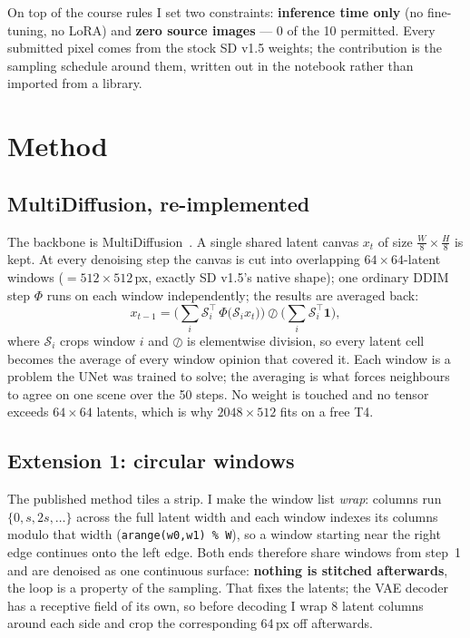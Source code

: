 \documentclass[10pt,a4paper,twocolumn]{article}
\newcommand{\tw}[1]{\texttt{\footnotesize #1}}
\begin{document}
On top of the course rules I set two constraints: \textbf{inference time only} (no
fine-tuning, no LoRA) and \textbf{zero source images} --- 0 of the 10 permitted.
Every submitted pixel comes from the stock SD v1.5 weights; the contribution is
the sampling schedule around them, written out in the notebook rather than
imported from a library.

\section{Method}

\subsection{MultiDiffusion, re-implemented}

The backbone is MultiDiffusion~\cite{multidiffusion}. A single shared latent
canvas $x_t$ of size $\tfrac{W}{8}\times\tfrac{H}{8}$ is kept. At every denoising
step the canvas is cut into overlapping $64\times64$-latent windows
($=512\times512$\,px, exactly SD v1.5's native shape); one ordinary DDIM step
$\Phi$ runs on each window independently; the results are averaged back:
\begin{equation}
x_{t-1}=\Big(\textstyle\sum_i \mathcal{S}_i^{\!\top}\,\Phi\big(\mathcal{S}_i x_t\big)\Big)
\oslash\Big(\textstyle\sum_i \mathcal{S}_i^{\!\top}\mathbf{1}\Big),
\end{equation}
where $\mathcal{S}_i$ crops window $i$ and $\oslash$ is elementwise division, so
every latent cell becomes the average of every window opinion that covered it.
Each window is a problem the UNet was trained to solve; the averaging is what
forces neighbours to agree on one scene over the 50 steps. No weight is touched
and no tensor exceeds $64\times64$ latents, which is why $2048\times512$ fits on a
free T4.

\subsection{Extension 1: circular windows}

The published method tiles a strip. I make the window list \emph{wrap}: columns
run $\{0,s,2s,\dots\}$ across the full latent width and each window indexes its
columns modulo that width (\tw{arange(w0,w1) \% W}), so a window starting near the
right edge continues onto the left edge. Both ends therefore share windows from
step~1 and are denoised as one continuous surface: \textbf{nothing is stitched
afterwards}, the loop is a property of the sampling. That fixes the latents; the
VAE decoder has a receptive field of its own, so before decoding I wrap 8 latent
columns around each side and crop the corresponding 64\,px off afterwards.
\end{document}
